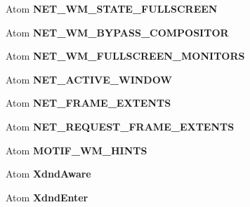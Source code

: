 \begin{DoxyCompactItemize}
\item 
\hypertarget{struct__GLFWlibraryX11_adb5fe704eb78af9dc9adf38142115bef}{}Atom {\bfseries N\+E\+T\+\_\+\+W\+M\+\_\+\+S\+T\+A\+T\+E\+\_\+\+F\+U\+L\+L\+S\+C\+R\+E\+E\+N}\label{struct__GLFWlibraryX11_adb5fe704eb78af9dc9adf38142115bef}

\item 
\hypertarget{struct__GLFWlibraryX11_a02ad593b27a0702d73b50579ee273ddf}{}Atom {\bfseries N\+E\+T\+\_\+\+W\+M\+\_\+\+B\+Y\+P\+A\+S\+S\+\_\+\+C\+O\+M\+P\+O\+S\+I\+T\+O\+R}\label{struct__GLFWlibraryX11_a02ad593b27a0702d73b50579ee273ddf}

\item 
\hypertarget{struct__GLFWlibraryX11_abfd74e48e59316a0331b897eafcbc775}{}Atom {\bfseries N\+E\+T\+\_\+\+W\+M\+\_\+\+F\+U\+L\+L\+S\+C\+R\+E\+E\+N\+\_\+\+M\+O\+N\+I\+T\+O\+R\+S}\label{struct__GLFWlibraryX11_abfd74e48e59316a0331b897eafcbc775}

\item 
\hypertarget{struct__GLFWlibraryX11_a605af2c701c3b768f71d6ffb4bab33f9}{}Atom {\bfseries N\+E\+T\+\_\+\+A\+C\+T\+I\+V\+E\+\_\+\+W\+I\+N\+D\+O\+W}\label{struct__GLFWlibraryX11_a605af2c701c3b768f71d6ffb4bab33f9}

\item 
\hypertarget{struct__GLFWlibraryX11_a3c92c43df56f7c7b4bc9768c4ea6cf9d}{}Atom {\bfseries N\+E\+T\+\_\+\+F\+R\+A\+M\+E\+\_\+\+E\+X\+T\+E\+N\+T\+S}\label{struct__GLFWlibraryX11_a3c92c43df56f7c7b4bc9768c4ea6cf9d}

\item 
\hypertarget{struct__GLFWlibraryX11_abc7f12ec664736508abf23899e2d7a31}{}Atom {\bfseries N\+E\+T\+\_\+\+R\+E\+Q\+U\+E\+S\+T\+\_\+\+F\+R\+A\+M\+E\+\_\+\+E\+X\+T\+E\+N\+T\+S}\label{struct__GLFWlibraryX11_abc7f12ec664736508abf23899e2d7a31}

\item 
\hypertarget{struct__GLFWlibraryX11_a067152471b25eaef4173c72d37b5927f}{}Atom {\bfseries M\+O\+T\+I\+F\+\_\+\+W\+M\+\_\+\+H\+I\+N\+T\+S}\label{struct__GLFWlibraryX11_a067152471b25eaef4173c72d37b5927f}

\item 
\hypertarget{struct__GLFWlibraryX11_ad9bcf550a504f968cd5cfaf7d1747990}{}Atom {\bfseries Xdnd\+Aware}\label{struct__GLFWlibraryX11_ad9bcf550a504f968cd5cfaf7d1747990}

\item 
\hypertarget{struct__GLFWlibraryX11_a46a6bffc947a9f751c9c5a439d6955cf}{}Atom {\bfseries Xdnd\+Enter}\label{struct__GLFWlibraryX11_a46a6bffc947a9f751c9c5a439d6955cf}


\end{DoxyCompactItemize}
